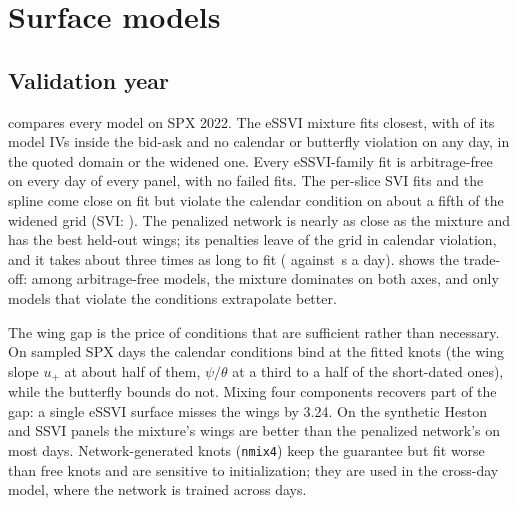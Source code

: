 \section{Surface models}
\label{sec:surfaces}

\subsection{Validation year}

 compares every model on SPX 2022. The eSSVI mixture fits closest, with
\mixInVal{} of its model IVs inside the bid-ask and no calendar or butterfly violation on any day,
in the quoted domain or the widened one. Every eSSVI-family fit is arbitrage-free on every day of
every panel, with no failed fits. The per-slice SVI fits and the spline come close on fit but
violate the calendar condition on about a fifth of the widened grid (SVI: \sviCalVal). The
penalized network is nearly as close as the mixture and has the best held-out wings; its penalties
leave \pnnCalVal{} of the grid in calendar violation, and it takes about three times as long to fit
(\pnnTimeVal{} against \mixTimeVal\,s a day).  shows the trade-off: among
arbitrage-free models, the mixture dominates on both axes, and only models that violate the
conditions extrapolate better.

The wing gap is the price of conditions that are sufficient rather than necessary. On sampled SPX
days the calendar conditions bind at the fitted knots (the wing slope $u_+$ at about half of them,
$\psi/\theta$ at a third to a half of the short-dated ones), while the butterfly bounds do not.
Mixing four components recovers part of the gap: a single eSSVI surface misses the wings by 3.24\vp.
On the synthetic Heston and SSVI panels the mixture's wings are better than the penalized
network's on most days. Network-generated knots (\texttt{nmix4}) keep the guarantee but fit worse
than free knots and are sensitive to initialization; they are used in the cross-day model, where
the network is trained across days.

\begin{table}[t]
  \centering\small
  \caption{Surface models on SPX 2022, the validation year (52 days). Quote columns are IV RMSE in
  vol points on fitted quotes, held-out interior strikes and held-out wings, and the share of model
  IVs inside the bid-ask; violations are shares of a dense grid over the quoted domain widened by
  50\% on each side; the last column is fitting time per day. Best values in bold.}
  \label{tab:models}
  
\end{table}

